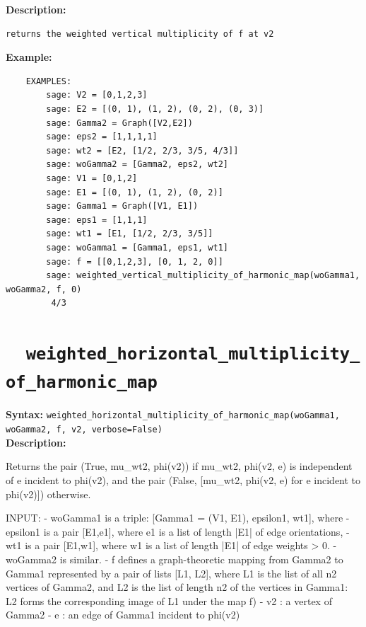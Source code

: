 \documentclass{article}
\begin{document}
\textbf{Description:}
\begin{verbatim}
returns the weighted vertical multiplicity of f at v2
\end{verbatim}

\textbf{Example:}
\begin{verbatim}
    EXAMPLES:
        sage: V2 = [0,1,2,3]
        sage: E2 = [(0, 1), (1, 2), (0, 2), (0, 3)]
        sage: Gamma2 = Graph([V2,E2])
        sage: eps2 = [1,1,1,1]
        sage: wt2 = [E2, [1/2, 2/3, 3/5, 4/3]]
        sage: woGamma2 = [Gamma2, eps2, wt2]
        sage: V1 = [0,1,2]
        sage: E1 = [(0, 1), (1, 2), (0, 2)]
        sage: Gamma1 = Graph([V1, E1])
        sage: eps1 = [1,1,1]
        sage: wt1 = [E1, [1/2, 2/3, 3/5]]
        sage: woGamma1 = [Gamma1, eps1, wt1]
        sage: f = [[0,1,2,3], [0, 1, 2, 0]]
        sage: weighted_vertical_multiplicity_of_harmonic_map(woGamma1, woGamma2, f, 0)
         4/3
\end{verbatim}

\section{\tt \ \ weighted\_horizontal\_multiplicity\_of\_harmonic\_map}

\textbf{Syntax:}
\verb}weighted_horizontal_multiplicity_of_harmonic_map(woGamma1, woGamma2, f, v2, verbose=False)}\\

\textbf{Description:}
\begin{spverbatim}
Returns the pair
           (True, mu\_{wt2, phi}(v2)) if  mu\_{wt2, phi}(v2, e) is independent of
                                       e incident to phi(v2),
and the pair
           (False, [mu\_{wt2, phi}(v2, e) for e incident to phi(v2)]) otherwise.

INPUT:
    - woGamma1 is a triple: [Gamma1 = (V1, E1), epsilon1, wt1], where 
    -  epsilon1 is a pair [E1,e1], where e1 is a list of length |E1| of edge orientations,
    -  wt1 is a pair [E1,w1], where w1 is a list of length |E1| of edge weights > 0.
    - woGamma2 is similar.
    - f  defines a graph-theoretic mapping
          from Gamma2 to Gamma1 represented by a pair of lists [L1, L2],
          where L1 is the list of all n2 vertices of Gamma2,
          and L2 is the list of length n2 of the vertices in Gamma1: L2 forms 
          the corresponding image of L1 under the map f)
    - v2 : a vertex of Gamma2
    - e : an edge of Gamma1 incident to phi(v2)
\end{spverbatim}
\end{document}
